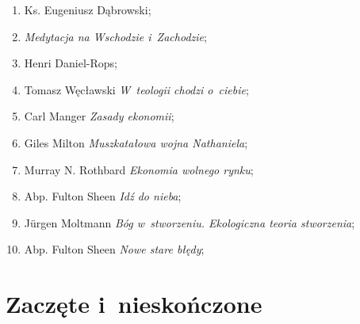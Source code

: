 \documentclass[a4paper,11pt]{article}
\begin{document}
\begin{enumerate}
\item Ks. Eugeniusz Dąbrowski;



\item \textit{Medytacja na Wschodzie i~Zachodzie};



\item Henri Daniel-Rops;



\item Tomasz Węcławski \textit{W~teologii chodzi o~ciebie};



\item Carl Manger \textit{Zasady ekonomii};



\item Giles Milton \textit{Muszkatałowa wojna Nathaniela};



\item Murray N. Rothbard \textit{Ekonomia wolnego rynku};



\item Abp. Fulton Sheen \textit{Idź do nieba};



\item J\"{u}rgen Moltmann \textit{Bóg w~stworzeniu. Ekologiczna teoria
    stworzenia};



\item Abp. Fulton Sheen \textit{Nowe stare błędy};

\end{enumerate}










\newpage
\section{Zaczęte i~nieskończone}

\vspace{2em}
\end{document}
